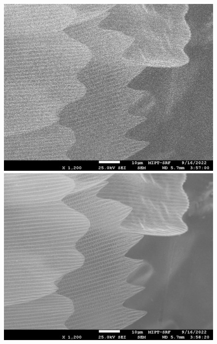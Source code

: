 \documentclass[a4paper,12pt]{article} %
\begin{document}
\begin{figure}[h]
\centering
\begin{minipage}{0.49\textwidth}
\includegraphics[width=\textwidth]{Butterfly001.jpg}
\vspace{-2em}
\end{minipage}
\begin{minipage}{0.49\textwidth}
\includegraphics[width=\textwidth]{Butterfly002.jpg}
\vspace{-2em}
\end{minipage}
\begin{minipage}{0.49\textwidth}

\end{minipage}
\end{figure}
\end{document}
